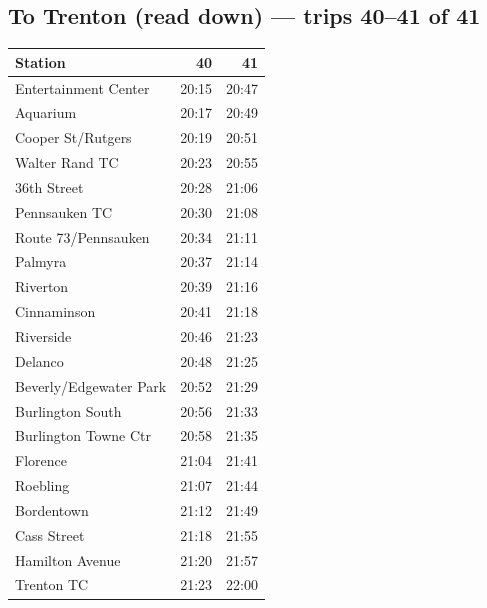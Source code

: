 \subsection*{To Trenton (read down) --- trips 40--41 of 41}
\begin{center}\footnotesize\setlength{\tabcolsep}{3pt}\begin{tabular}{@{}lrr@{}}\toprule
Station & 40 & 41 \\\midrule
Entertainment Center & 20:15 & 20:47 \\
Aquarium & 20:17 & 20:49 \\
Cooper St/Rutgers & 20:19 & 20:51 \\
Walter Rand TC & 20:23 & 20:55 \\
36th Street & 20:28 & 21:06 \\
Pennsauken TC & 20:30 & 21:08 \\
Route 73/Pennsauken & 20:34 & 21:11 \\
Palmyra & 20:37 & 21:14 \\
Riverton & 20:39 & 21:16 \\
Cinnaminson & 20:41 & 21:18 \\
Riverside & 20:46 & 21:23 \\
Delanco & 20:48 & 21:25 \\
Beverly/Edgewater Park & 20:52 & 21:29 \\
Burlington South & 20:56 & 21:33 \\
Burlington Towne Ctr & 20:58 & 21:35 \\
Florence & 21:04 & 21:41 \\
Roebling & 21:07 & 21:44 \\
Bordentown & 21:12 & 21:49 \\
Cass Street & 21:18 & 21:55 \\
Hamilton Avenue & 21:20 & 21:57 \\
Trenton TC & 21:23 & 22:00 \\
\bottomrule\end{tabular}\end{center}
